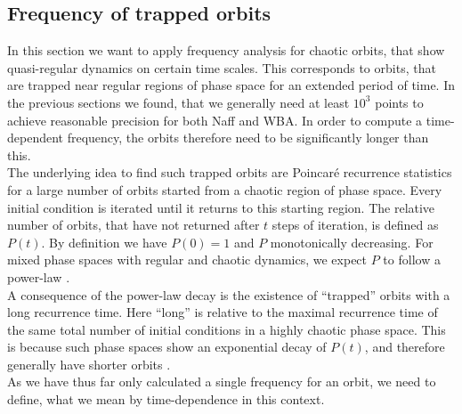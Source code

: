 \subsection{Frequency of trapped orbits}
In this section we want to apply frequency analysis for chaotic orbits, that show quasi-regular dynamics on certain time scales.
This corresponds to orbits, that are trapped near regular regions of phase space for an extended period of time.
In the previous sections we found, that we generally need at least $10^3$ points to achieve reasonable precision for both Naff and WBA.
In order to compute a time-dependent frequency, the orbits therefore need to be significantly longer than this.
\\
The underlying idea to find such trapped orbits are Poincaré recurrence statistics for a large number of orbits started from a chaotic region of phase space. 
Every initial condition is iterated until it returns to this starting region. 
The relative number of orbits, that have not returned after $t$ steps of iteration, is defined as $P(t)$. 
By definition we have $P(0)=1$ and $P$ monotonically decreasing. 
For mixed phase spaces with regular and chaotic dynamics, we expect $P$ to follow a power-law \cite{ChaLeb1980,HanCarMei1985,BauBer1990,WeiHufKet2002,FirLanKetBae2018}.
\\
A consequence of the power-law decay is the existence of ``trapped'' orbits with a long recurrence time. 
Here ``long'' is relative to the maximal recurrence time of the same total number of initial conditions in a highly chaotic phase space. 
This is because such phase spaces show an exponential decay of $P(t)$, and therefore generally have shorter orbits \cite{BauBer1990,HirSauVai1999}. 
\\
As we have thus far only calculated a single frequency for an orbit, we need to define, what we mean by time-dependence in this context.
